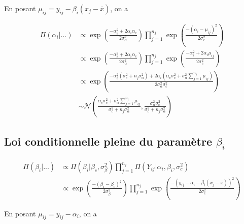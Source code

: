 \documentclass[
]{article}
\begin{document}
En posant \(\mu_{ij} = y_{ij} - \beta_i(x_{j}-\bar{x})\), on a

\begin{align*}
\Pi(\alpha_{i}|...)&\propto \exp\left(\frac{-\alpha_i^2+2\alpha_i\alpha_c}{2\sigma_{\alpha}^{2}}\right) \prod_{j=1}^{n_{j}} \exp\left(\frac{-(\alpha_{i}-\mu_{ij})^{2}}{2\sigma_{c}^{2}}\right)  \\
        &\propto \exp\left(\frac{-\alpha_i^2+2\alpha_i\alpha_c}{2\sigma_{\alpha}^{2}}\right) \prod_{j=1}^{n_{j}} \exp\left(\frac{-\alpha_i^2+2\alpha_i\mu_{ij}}{2\sigma_{c}^{2}}\right)  \\
        &\propto \exp\left(\frac{-\alpha_i^2(\sigma_c^2+n_j\sigma_{\alpha}^2) +2\alpha_i(\alpha_c\sigma_c^2+\sigma_{\alpha}^2\sum\limits_{j=1}^{n_j} \mu_{ij})}{2\sigma_{\alpha}^{2}\sigma_c^2}\right)\\
        &\sim \mathcal{N}\left(\frac{\alpha_c\sigma_c^2+\sigma_{\alpha}^2\sum\limits_{j=1}^{n_j} \mu_{ij}}{\sigma_c^2+n_j\sigma_{\alpha}^2},\frac{\sigma_{\alpha}^{2}\sigma_c^2}{\sigma_c^2+n_j\sigma_{\alpha}^2}\right)
\end{align*}

\hypertarget{loi-conditionnelle-pleine-du-paramuxe8tre-beta_i}{%
\subsection{\texorpdfstring{Loi conditionnelle pleine du paramètre
\(\beta_i\)}{Loi conditionnelle pleine du paramètre \textbackslash beta\_i}}\label{loi-conditionnelle-pleine-du-paramuxe8tre-beta_i}}

\begin{align*}
\Pi(\beta_{i}|...) &\propto \Pi(\beta_{i}|\beta_{c},\sigma_{\beta}^{2} ) \prod_{j=1}^{n_{j}} \Pi(Y_{ij}|\alpha_{i},\beta_{i},\sigma_{c}^{2} ) \\
        &\propto \exp\left(\frac{-(\beta_{i}-\beta_{c})^{2}}{2\sigma_{\beta}^{2}}\right) \prod_{j=1}^{n_{j}} \exp\left(\frac{-(y_{ij}-\alpha_{i}-\beta_i(x_{j}-\bar{x}))^{2}}{2\sigma_{c}^{2}}\right) 
\end{align*}

En posant \(\mu_{ij} = y_{ij} - \alpha_i\), on a
\end{document}

